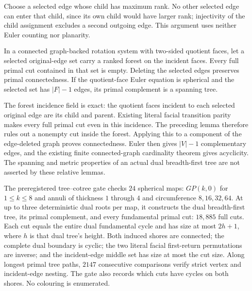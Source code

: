 Choose a selected edge whose child has maximum rank.  No other selected
edge can enter that child, since its own child would have larger rank;
injectivity of the child assignment excludes a second outgoing edge.
This argument uses neither Euler counting nor planarity.

\begin{theorem}
In a connected graph-backed rotation system with two-sided quotient
faces, let a selected original-edge set carry a ranked forest on the
incident faces.  Every full primal cut contained in that set is empty.
Deleting the selected edges preserves primal connectedness.  If the
quotient-face Euler equation is spherical and the selected set has
$|F|-1$ edges, its primal complement is a spanning tree.
\end{theorem}

The forest incidence field is exact: the quotient faces incident to each
selected original edge are its child and parent.  Existing literal facial
transition parity makes every full primal cut even in this incidence.
The preceding lemma therefore rules out a nonempty cut inside the forest.
Applying this to a component of the edge-deleted graph proves
connectedness.  Euler then gives $|V|-1$ complementary edges, and the
existing finite connected-graph cardinality theorem gives acyclicity.
The spanning and metric properties of an actual dual breadth-first tree
are not asserted by these relative lemmas.

The preregistered tree--cotree gate checks $24$ spherical maps: $GP(k,0)$
for $1\le k\le8$ and annuli of thickness $1$ through $4$ and circumference
$8,16,32,64$.  At up to three deterministic dual roots per map, it
constructs the dual breadth-first tree, its primal complement, and every
fundamental primal cut: $18{,}885$ full cuts.  Each cut equals the entire
dual fundamental cycle and has size at most $2h+1$, where $h$ is that
dual tree's height.  Both induced shores are connected; the complete dual
boundary is cyclic; the two literal facial first-return permutations are
inverse; and the incident-edge middle set has size at most the cut size.
Along longest primal tree paths, $2147$ consecutive comparisons verify
strict vertex and incident-edge nesting.  The gate also records which
cuts have cycles on both shores.  No colouring is enumerated.


